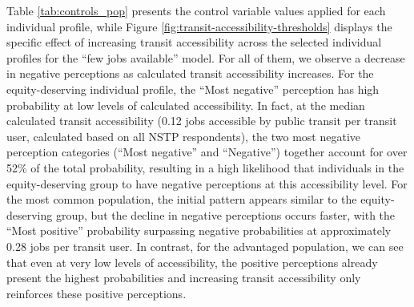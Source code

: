 \documentclass[preprint, 3p,
authoryear]{elsarticle} %
\begin{document}
Table \ref{tab:controls_pop} presents the control variable values
applied for each individual profile, while Figure
\ref{fig:transit-accessibility-thresholds} displays the specific effect
of increasing transit accessibility across the selected individual
profiles for the ``few jobs available'' model. For all of them, we
observe a decrease in negative perceptions as calculated transit
accessibility increases. For the equity-deserving individual profile,
the ``Most negative'' perception has high probability at low levels of
calculated accessibility. In fact, at the median calculated transit
accessibility (0.12 jobs accessible by public transit per transit user,
calculated based on all NSTP respondents), the two most negative
perception categories (``Most negative'' and ``Negative'') together
account for over 52\% of the total probability, resulting in a high
likelihood that individuals in the equity-deserving group to have
negative perceptions at this accessibility level. For the most common
population, the initial pattern appears similar to the equity-deserving
group, but the decline in negative perceptions occurs faster, with the
``Most positive'' probability surpassing negative probabilities at
approximately 0.28 jobs per transit user. In contrast, for the
advantaged population, we can see that even at very low levels of
accessibility, the positive perceptions already present the highest
probabilities and increasing transit accessibility only reinforces these
positive perceptions.
\end{document}
